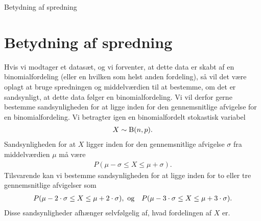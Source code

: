 
\begin{center}
\Huge
Betydning af spredning
\end{center}

\section*{Betydning af spredning}

Hvis vi modtager et datasæt, og vi forventer, at dette data er skabt af en binomialfordeling (eller en hvilken som helst anden fordeling), så vil det være oplagt at bruge spredningen og middelværdien til at bestemme, om det er sandsynligt, at dette data følger en binomialfordeling. Vi vil derfor gerne bestemme sandsynligheden for at ligge inden for den gennemsnitlige afvigelse for en binomialfordeling. Vi betragter igen en binomialfordelt stokastisk variabel 
\begin{align*}
X \sim \textnormal{B}(n,p).
\end{align*}
Sandsynligheden for at $X$ ligger inden for den gennemsnitlige afvigelse $\sigma$ fra middelværdien $\mu$ må være
\begin{align*}
P(\mu - \sigma \leq X \leq \mu + \sigma).
\end{align*}
Tilsvarende kan vi bestemme sandsynligheden for at ligge inden for to eller tre gennemsnitlige afvigelser som
\begin{align*}
&P(\mu - 2\cdot \sigma \leq X \leq \mu + 2\cdot \sigma), \textnormal{ og}
&P(\mu - 3\cdot \sigma \leq X \leq \mu + 3\cdot \sigma).
\end{align*}
Disse sandsynligheder afhænger selvfølgelig af, hvad fordelingen af $X$ er. 
